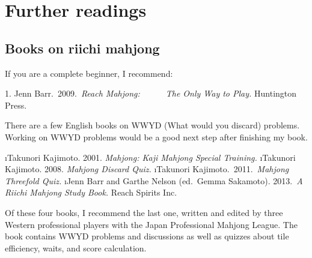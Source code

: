 \chapter{Further readings} \label{ch:read}
\thispagestyle{empty}
\section{Books on riichi mahjong}

If you are a complete beginner, I recommend:

\bigskip
\noindent \hspace{10pt}1. Jenn Barr.~2009.~\textit{Reach Mahjong:}\textit{~~~~~~The Only Way to Play.} Huntington Press.

\bigskip There are a few English books on WWYD (What would you discard) problems. Working on WWYD problems would be a good next step after finishing my book.




\be \setcounter{enumi}{1}
\i Takunori Kajimoto. 2001. \textit{Mahjong: Kaji Mahjong Special Training.}
\i Takunori Kajimoto. 2008. \textit{Mahjong Discard Quiz.} 
\i Takunori Kajimoto.~2011.~\textit{Mahjong Threefold Quiz.} 
\i Jenn Barr and Garthe Nelson (ed.~Gemma Sakamoto). 2013.~\textit{A Riichi Mahjong Study Book.} Reach Spirits Inc.
\ee {}


Of these four books, I recommend the last one, written and edited by three Western professional players with the Japan Professional Mahjong League. The book contains WWYD problems and discussions as well as quizzes about tile efficiency, waits, and score calculation. 

